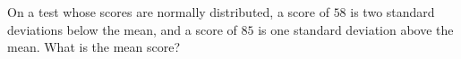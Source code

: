 On a test whose scores are normally distributed, a score of $58$ is two standard deviations below the mean, and a score of $85$ is one standard deviation above the mean. What is the mean score?
